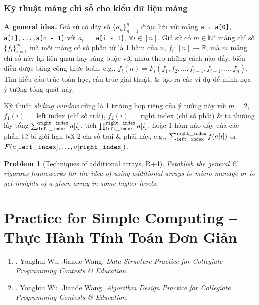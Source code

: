\documentclass{article}
\newtheorem{problem}{Problem}
\begin{document}
\subsubsection{Kỹ thuật mảng chỉ số cho kiểu dữ liệu mảng}
{\bf A general idea.} Giả sử có dãy số $\{a_n\}_{n=1}^n$ được lưu với mảng {\tt a = a[0], a[1],...,a[n - 1]} với $a_i =$ {\tt a[i - 1]}, $\forall i\in[n]$. Giả sử có $m\in\mathbb{N}^\star$ mảng chỉ số $\{f_i\}_{i=1}^m$ mà mỗi mảng có số phần tử là 1 hàm của $n$, $f_i:[n]\to\mathbb{R}$, mà $m$ mảng chỉ số này lại liên quan hay ràng buộc với nhau theo những cách nào đấy, biểu diễn được bằng công thức toán, e.g., $f_i(n) = F_i(f_1,f_2,\ldots,f_{i-1},f_{i+1},\ldots,f_n)$. Tìm hiểu cấu trúc toán học, cấu trúc giải thuật, \& tạo ra các ví dụ để minh họa ý tưởng tổng quát này.

Kỹ thuật {\it sliding window} cũng là 1 trường hợp riêng của ý tưởng này với $m = 2$, $f_1(i) =$ left index (chỉ số trái), $f_2(i) =$ right index (chỉ số phải) \& ta thường lấy tổng $\sum_{\tt left\_index}^{\tt right\_index} a[i]$, tích $\prod_{\tt left\_index}^{\tt right\_index} a[i]$, hoặc 1 hàm nào đấy của các phần tử bị giới hạn bởi 2 chỉ số trái \& phải này, e.g., $\sum_{\tt left\_index}^{\tt right\_index} f(a[i])$ or $F(a[{\tt left\_index}],\ldots,a[{\tt right\_index}])$.

\begin{problem}[Techniques of additional arrays, R+4]
	Establish the general \& rigorous frameworks for the idea of using additional arrays to micro manage or to get insights of a given array in some higher levels.
\end{problem}


\section{Practice for Simple Computing -- Thực Hành Tính Toán Đơn Giản}

\begin{enumerate}
	\item \cite{Wu_Wang2016}. {\sc Yonghui Wu, Jiande Wang}. {\it Data Structure Practice for Collegiate Programming Contests \& Education}.
	\item \cite{Wu_Wang2018}. {\sc Yonghui Wu, Jiande Wang}. {\it Algorithm Design Practice for Collegiate Programming Contests \& Education}.
\end{enumerate}
\end{document}
